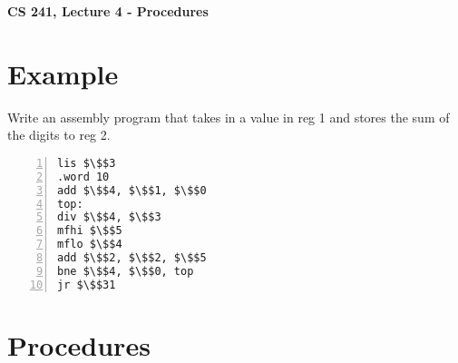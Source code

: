 \documentclass[12pt]{article}
\author{Clement Tsang}
\begin{document}
\begin{center}
\Large\textbf{CS 241, Lecture 4 - Procedures}
\end{center}

\section{Example}
Write an assembly program that takes in a value in reg 1 and stores the sum of the digits to reg 2.
\begin{lstlisting}[mathescape, numbers=left, breaklines=true]
lis $\$$3
.word 10
add $\$$4, $\$$1, $\$$0
top:
div $\$$4, $\$$3
mfhi $\$$5
mflo $\$$4
add $\$$2, $\$$2, $\$$5
bne $\$$4, $\$$0, top
jr $\$$31
\end{lstlisting}

\section{Procedures}
\end{document}
